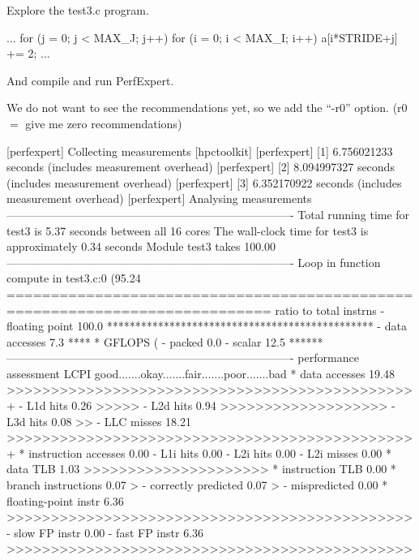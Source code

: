 Explore the test3.c program.

\begin{prompt}
...
for (j = 0; j <{} MAX_J; j++)
 for (i = 0; i <{} MAX_I; i++)
   a[i*STRIDE+j] += 2;
...
\end{prompt}

And compile and run PerfExpert.

We do not want to see the recommendations yet, so we add the ``-r0'' option.  (r0 $=$ give me zero recommendations)

\begin{prompt}
[perfexpert] Collecting measurements [hpctoolkit]
[perfexpert]    [1] 6.756021233 seconds (includes measurement overhead)
[perfexpert]    [2] 8.094997327 seconds (includes measurement overhead)
[perfexpert]    [3] 6.352170922 seconds (includes measurement overhead)
[perfexpert] Analysing measurements
----------------------------------------------------------------------------
Total running time for test3 is 5.37 seconds between all 16 cores
The wall-clock time for test3 is approximately 0.34 seconds
Module test3 takes 100.00%
----------------------------------------------------------------------------
Loop in function compute in test3.c:0 (95.24%
============================================================================
ratio to total instrns    %
 - floating point      100.0 ***********************************************
 - data accesses         7.3 ****
* GFLOPS (%
 - packed                0.0
 - scalar               12.5 ******
----------------------------------------------------------------------------
performance assessment  LCPI good.......okay.......fair.......poor.......bad
* data accesses        19.48 >>>>>>>>>>>>>>>>>>>>>>>>>>>>>>>>>>>>>>>>>>>>>>+
 - L1d hits             0.26 >>>>>
 - L2d hits             0.94 >>>>>>>>>>>>>>>>>>>
 - L3d hits             0.08 >>
 - LLC misses          18.21 >>>>>>>>>>>>>>>>>>>>>>>>>>>>>>>>>>>>>>>>>>>>>>+
* instruction accesses  0.00
 - L1i hits             0.00
 - L2i hits             0.00
 - L2i misses           0.00
* data TLB              1.03 >>>>>>>>>>>>>>>>>>>>>
* instruction TLB       0.00
* branch instructions   0.07 >
 - correctly predicted  0.07 >
 - mispredicted         0.00
* floating-point instr  6.36 >>>>>>>>>>>>>>>>>>>>>>>>>>>>>>>>>>>>>>>>>>>>>>
 - slow FP instr        0.00
 - fast FP instr        6.36 >>>>>>>>>>>>>>>>>>>>>>>>>>>>>>>>>>>>>>>>>>>>>>
\end{prompt}

